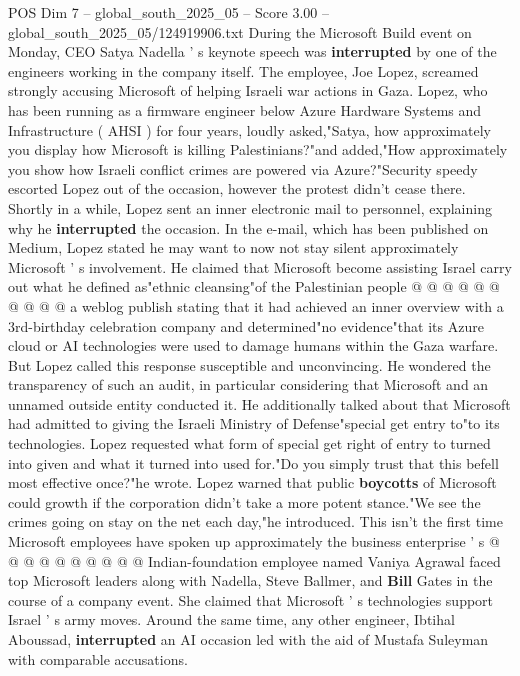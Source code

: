 \begin{textsample}{POS Dim 7 – global\_south\_2025\_05 – Score 3.00 – global\_south\_2025\_05/124919906.txt}  \label{ex:f7_pos_445}
During the Microsoft Build event on Monday, CEO Satya Nadella ' s keynote speech was \textbf{interrupted} by one of the engineers working in the company itself.
The employee, Joe Lopez, screamed strongly accusing Microsoft of helping Israeli war actions in Gaza.
Lopez, who has been running as a firmware engineer below Azure Hardware Systems and Infrastructure ( AHSI ) for four years, loudly asked,"Satya, how approximately you display how Microsoft is killing Palestinians?"and added,"How approximately you show how Israeli conflict crimes are powered via Azure?"Security speedy escorted Lopez out of the occasion, however the protest didn't cease there.
Shortly in a while, Lopez sent an inner electronic mail to personnel, explaining why he \textbf{interrupted} the occasion.
In the e-mail, which has been published on Medium, Lopez stated he may want to now not stay silent approximately Microsoft ' s involvement.
He claimed that Microsoft become assisting Israel carry out what he defined as"ethnic cleansing"of the Palestinian people @ @ @ @ @ @ @ @ @ @ a weblog publish stating that it had achieved an inner overview with a 3rd-birthday celebration company and determined"no evidence"that its Azure cloud or AI technologies were used to damage humans within the Gaza warfare.
But Lopez called this response susceptible and unconvincing.
He wondered the transparency of such an audit, in particular considering that Microsoft and an unnamed outside entity conducted it.
He additionally talked about that Microsoft had admitted to giving the Israeli Ministry of Defense"special get entry to"to its technologies.
Lopez requested what form of special get right of entry to turned into given and what it turned into used for."Do you simply trust that this befell most effective once?"he wrote.
Lopez warned that public \textbf{boycotts} of Microsoft could growth if the corporation didn't take a more potent stance."We see the crimes going on stay on the net each day,"he introduced.
This isn't the first time Microsoft employees have spoken up approximately the business enterprise ' s @ @ @ @ @ @ @ @ @ @ Indian-foundation employee named Vaniya Agrawal faced top Microsoft leaders along with Nadella, Steve Ballmer, and \textbf{Bill} Gates in the course of a company event.
She claimed that Microsoft ' s technologies support Israel ' s army moves.
Around the same time, any other engineer, Ibtihal Aboussad, \textbf{interrupted} an AI occasion led with the aid of Mustafa Suleyman with comparable accusations.

\end{textsample}
